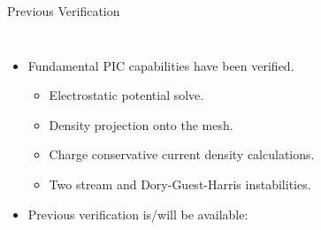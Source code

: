 \begin{frame}{Previous Verification}
  \begin{columns}
    \begin{itemize}
      \item Fundamental PIC capabilities have been verified.\cite{gall2024kinetic}
      \begin{itemize}
        \item Electrostatic potential solve.
        \item Density projection onto the mesh.
        \item Charge conservative current density calculations.
        \item Two stream and Dory-Guest-Harris instabilities.
      \end{itemize}
      \item Previous verification is/will be available:
    \end{itemize}
    \begin{figure}
\end{figure}
\end{columns}
\end{frame}
